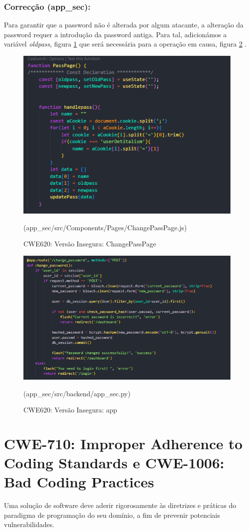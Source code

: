 \subsubsection{Correcção (app\_sec):}
Para garantir que a password não é alterada por algum atacante, a alteração da password requer a introdução da password antiga. Para tal, adicionámos a variável \textit{oldpass}, figura \ref{fig:cwe620-safe-changepasspage} que será necessária para a operação em causa, figura \ref{fig:cwe620-safe-app} .
\begin{figure}[H]
\centering
    \includegraphics[width=0.7\linewidth]{images/CWE620-safe-ChangePassPage.png}
    \caption{CWE620: Versão Insegura: ChangePassPage }(app\_sec/src/Components/Pages/ChangePassPage.js)%
    \label{fig:cwe620-safe-changepasspage}
\end{figure}
\begin{figure}[H]
\centering
    \includegraphics[width=0.7\linewidth]{images/CWE620-safe-app_sec.png}
    \caption{CWE620: Versão Insegura: app  }(app\_sec/src/backend/app\_sec.py)%
    \label{fig:cwe620-safe-app}
\end{figure}


\section{CWE-710: Improper Adherence to Coding Standards e CWE-1006: Bad Coding Practices}
\label{sec.cwe710}
\label{sec.cwe1006}
Uma solução de software deve aderir rigorosamente às diretrizes e práticas do paradigma de programação do seu domínio, a fim de prevenir potenciais vulnerabilidades. 


